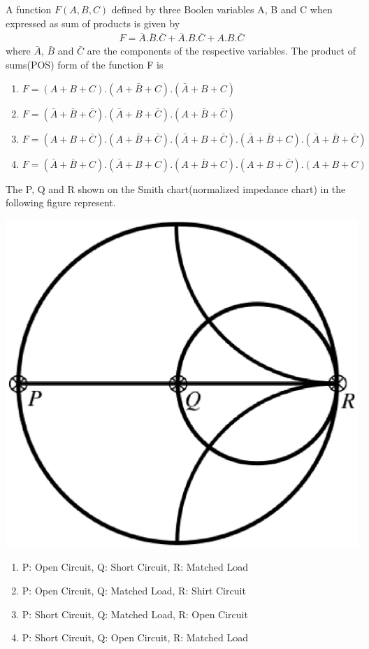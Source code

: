 \item A function $F(A, B, C)$ defined by three Boolen variables A, B and C when expressed as sum of products is given by
\begin{align*}
F = \bar{A}.\bar{B}.\bar{C} + \bar{A}.B.\bar{C} + A.B.\bar{C}
\end{align*}
where $\bar{A}$, $\bar{B}$ and $\bar{C}$ are the components of the respective variables. The product of sums(POS) form of the function F is
\begin{enumerate}
\item $F = (A + B + C).(A + \bar{B} + C).(\bar{A} + B + C)$
\item $F = (\bar{A} + \bar{B} + \bar{C}).(\bar{A} + B + \bar{C}).(A + \bar{B} + \bar{C})$
\item $F = (A + B + \bar{C}).(A + \bar{B} + \bar{C}).(\bar{A} + B + \bar{C}).(\bar{A} + \bar{B} + C).(\bar{A} + \bar{B} + \bar{C})$
\item $F = (\bar{A} + \bar{B} + C).(\bar{A} + B + C).(A + \bar{B} + C).(A + B + \bar{C}).(A + B + C)$
\end{enumerate}

\item The P, Q and R shown on the Smith chart(normalized impedance chart) in the following figure represent.

\includegraphics[scale=0.3]{20}

\begin{enumerate}
\item P: Open Circuit, Q: Short Circuit, R: Matched Load
\item P: Open Circuit, Q: Matched Load, R: Shirt Circuit
\item P: Short Circuit, Q: Matched Load, R: Open Circuit
\item P: Short Circuit, Q: Open Circuit, R: Matched Load
\end{enumerate}

